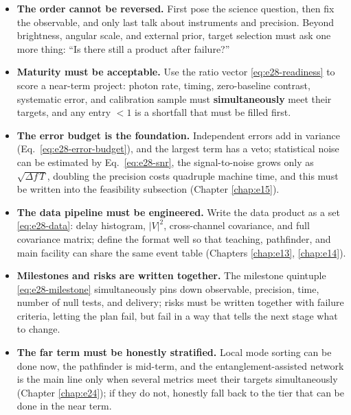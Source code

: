 \begin{itemize}
  \item \textbf{The order cannot be reversed.} First pose the science question, then fix the observable, and only last talk about instruments and precision. Beyond brightness, angular scale, and external prior, target selection must ask one more thing: ``Is there still a product after failure?''
  \item \textbf{Maturity must be acceptable.} Use the ratio vector \eqref{eq:e28-readiness} to score a near-term project: photon rate, timing, zero-baseline contrast, systematic error, and calibration sample must \textbf{simultaneously} meet their targets, and any entry \(<1\) is a shortfall that must be filled first.
  \item \textbf{The error budget is the foundation.} Independent errors add in variance (Eq.\ \eqref{eq:e28-error-budget}), and the largest term has a veto; statistical noise can be estimated by Eq.\ \eqref{eq:e28-snr}, the signal-to-noise grows only as \(\sqrt{\Delta f\,T}\), doubling the precision costs quadruple machine time, and this must be written into the feasibility subsection (Chapter \ref{chap:e15}).
  \item \textbf{The data pipeline must be engineered.} Write the data product as a set \eqref{eq:e28-data}: delay histogram, \(|V|^2\), cross-channel covariance, and full covariance matrix; define the format well so that teaching, pathfinder, and main facility can share the same event table (Chapters \ref{chap:e13}, \ref{chap:e14}).
  \item \textbf{Milestones and risks are written together.} The milestone quintuple \eqref{eq:e28-milestone} simultaneously pins down observable, precision, time, number of null tests, and delivery; risks must be written together with failure criteria, letting the plan fail, but fail in a way that tells the next stage what to change.
  \item \textbf{The far term must be honestly stratified.} Local mode sorting can be done now, the pathfinder is mid-term, and the entanglement-assisted network is the main line only when several metrics meet their targets simultaneously (Chapter \ref{chap:e24}); if they do not, honestly fall back to the tier that can be done in the near term.
\end{itemize}

